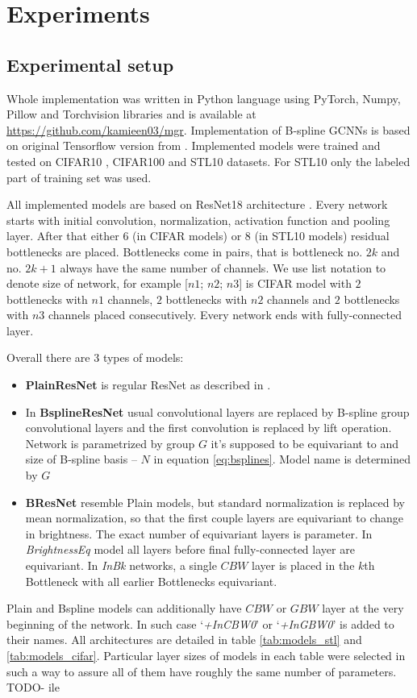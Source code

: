 \section{Experiments}
\subsection{Experimental setup}
Whole implementation was written in Python language using
PyTorch, Numpy, Pillow and Torchvision libraries
and is available at
\url{https://github.com/kamieen03/mgr}.
Implementation
of B-spline GCNNs is based on original Tensorflow version from
\cite{bekkers2019}.
Implemented models were trained and tested on CIFAR10 \cite{cifar},
CIFAR100 \cite{cifar} and STL10 \cite{stl10} datasets.
For STL10 only the labeled part of training set was used.

All implemented models are based on ResNet18 architecture \cite{resnet}.
Every network starts with initial convolution, normalization, activation
function and pooling layer. After that either $6$ (in CIFAR models)
or $8$ (in STL10 models) residual bottlenecks are
placed. Bottlenecks come in pairs, that is bottleneck no. $2k$ and no. $2k+1$
always have the same number of channels. We use list notation to denote size of
network, for example [$\mathit{n1}$; $\mathit{n2}$; $\mathit{n3}$]
is CIFAR model with $2$ bottlenecks with $n1$ channels, $2$ bottlenecks with
$n2$ channels and $2$ bottlenecks with $n3$ channels placed consecutively.
Every network ends with
fully-connected layer.

Overall there are 3 types of models:
\begin{itemize}
    \item \textbf{PlainResNet} is regular ResNet as described in \cite{resnet}.
    \item In \textbf{BsplineResNet} usual convolutional layers are replaced by
        B-spline group convolutional layers and the first convolution is replaced
        by lift operation. Network is parametrized by group $G$ it's supposed to be
        equivariant to and size of B-spline basis -- $N$ in equation
        \ref{eq:bsplines}. Model name is determined by $G$
    \item \textbf{BResNet} resemble Plain models, but standard normalization is
        replaced by mean normalization, so that the first couple layers are
        equivariant to change in brightness. The exact number of equivariant
        layers is parameter. In \textit{BrightnessEq} model all layers before
        final fully-connected layer are equivariant. In \textit{InBk} networks,
        a single $CBW$ layer is placed in the $k$th Bottleneck with all earlier
        Bottlenecks equivariant.
\end{itemize}
Plain and Bspline models can additionally have $\mathit{CBW}$ or $\mathit{GBW}$
layer at the very beginning of the network. In such case `\textit{+InCBW0}' or
`\textit{+InGBW0}' is added to their names. All architectures are detailed in
table \ref{tab:models_stl} and \ref{tab:models_cifar}. Particular layer sizes of
models in each table were selected in such a way to assure all of them have
roughly the same number of parameters. TODO- ile

